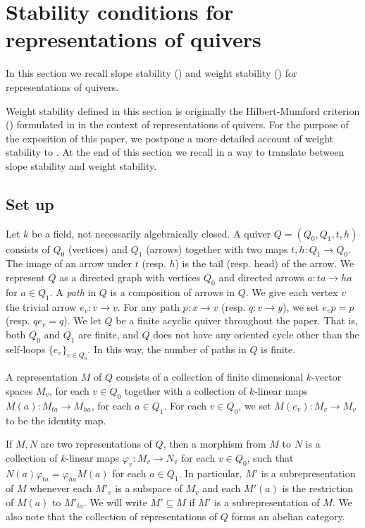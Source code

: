 \documentclass[a4paper]{amsart}
\numberwithin{equation}{section}
\theoremstyle{plain}
\theoremstyle{definition}
\begin{document}
\section{Stability conditions for representations of quivers}\label{stability_conditions_for_representations_of_quivers}
In this section we recall slope stability () and weight stability () for representations of quivers.

Weight stability defined in this section is originally the Hilbert-Mumford criterion () formulated in \cite{MR1315461} in the context of representations of quivers. For the purpose of the exposition of this paper, we postpone a more detailed account of weight stability to . At the end of this section we recall in  a way to translate between slope stability and weight stability.
\subsection{Set up}
Let $k$ be a field, not necessarily algebraically closed. A quiver $Q=(Q_0,Q_1,t,h)$ consists of $Q_0$ (vertices) and $Q_1$ (arrows) together with two maps $t,h:Q_1\rightarrow Q_0$. The image of an arrow under $t$ (resp. $h$) is the tail (resp. head) of the arrow. We represent $Q$ as a directed graph with vertices $Q_0$ and directed arrows $a:ta\rightarrow ha$ for $a\in Q_1$. A \emph{path} in $Q$ is a composition of arrows in $Q$. We give each vertex $v$ the trivial arrow $e_v:v\rightarrow v$. For any path $p:x\rightarrow v$ (resp. $q:v\rightarrow y$), we set $e_vp=p$ (resp. $qe_v=q$). We let $Q$ be a finite acyclic quiver throughout the paper. That is, both $Q_0$ and $Q_1$ are finite, and $Q$ does not have any oriented cycle other than the self-loops $\{e_v\}_{v\in Q_0}$. In this way, the number of paths in $Q$ is finite.

A representation $M$ of $Q$ consists of a collection of finite dimensional $k$-vector spaces $M_{v}$, for each $v\in Q_0$ together with a collection of $k$-linear maps $M(a):M_{ta}\rightarrow M_{ha}$, for each $a\in Q_1$. For each $v\in Q_0$, we set  $M(e_v):M_v\rightarrow M_v$ to be the identity map. 

If $M,N$ are two representations of $Q$, then a morphism from $M$ to $N$ is a collection of $k$-linear maps $\varphi_v:M_v\rightarrow N_v$ for each $v\in Q_0$, such that $N(a)\varphi_{ta}=\varphi_{ha}M(a)$ for each $a\in Q_1$. In particular, $M'$ is a subrepresentation of $M$ whenever each $M'_v$ is a subspace of $M_v$ and each $M'(a)$ is the restriction of $M(a)$ to $M'_{ta}$. We will write $M'\subseteq M$ if $M'$ is a subrepresentation of $M$. We also note that the collection of representations of $Q$ forms an abelian category.
\end{document}
